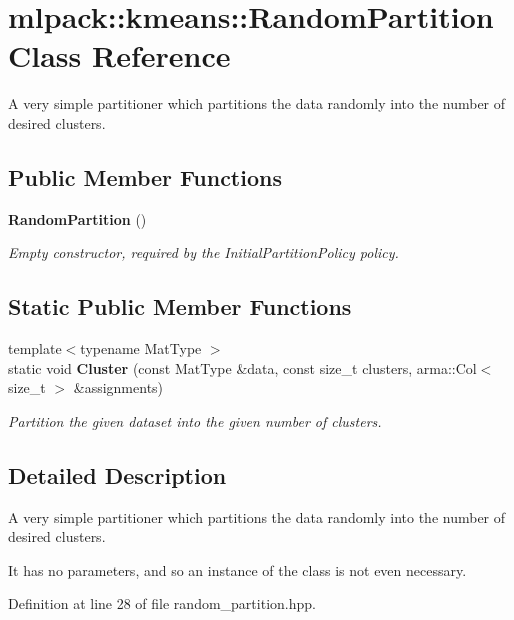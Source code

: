 \section{mlpack\-:\-:kmeans\-:\-:Random\-Partition Class Reference}
\label{classmlpack_1_1kmeans_1_1RandomPartition}


A very simple partitioner which partitions the data randomly into the number of desired clusters.  


\subsection*{Public Member Functions}
\begin{DoxyCompactItemize}
\item 
{\bf Random\-Partition} ()
\begin{DoxyCompactList}\small\item\em Empty constructor, required by the Initial\-Partition\-Policy policy. \end{DoxyCompactList}\end{DoxyCompactItemize}
\subsection*{Static Public Member Functions}
\begin{DoxyCompactItemize}
\item 
{\footnotesize template$<$typename Mat\-Type $>$ }\\static void {\bf Cluster} (const Mat\-Type \&data, const size\-\_\-t clusters, arma\-::\-Col$<$ size\-\_\-t $>$ \&assignments)
\begin{DoxyCompactList}\small\item\em Partition the given dataset into the given number of clusters. \end{DoxyCompactList}\end{DoxyCompactItemize}


\subsection{Detailed Description}
A very simple partitioner which partitions the data randomly into the number of desired clusters. 

It has no parameters, and so an instance of the class is not even necessary. 

Definition at line 28 of file random\-\_\-partition.\-hpp.



